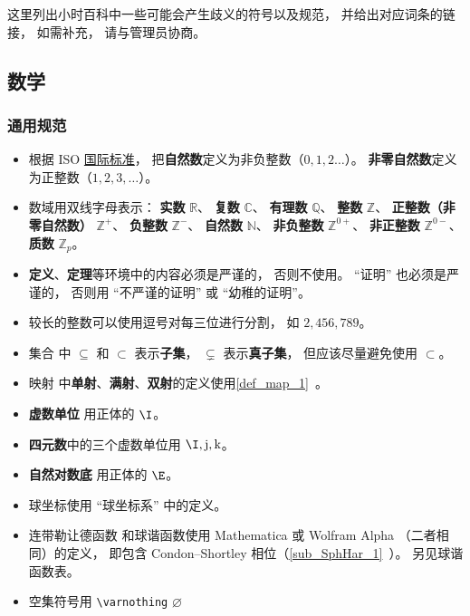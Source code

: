 
这里列出小时百科中一些可能会产生歧义的符号以及规范， 并给出对应词条的链接， 如需补充， 请与管理员协商。

\subsection{数学}
\subsubsection{通用规范}
\begin{itemize}
\item 根据 ISO \href{https://en.wikipedia.org/wiki/ISO/IEC_80000}{国际标准}， 把\textbf{自然数}定义为非负整数（$0,1,2\dots$）。 \textbf{非零自然数}定义为正整数（$1,2,3,\dots$）。
\item 数域用双线字母表示： \textbf{实数} $\mathbb R$、 \textbf{复数} $\mathbb C$、 \textbf{有理数} $\mathbb Q$、 \textbf{整数} $\mathbb Z$、 \textbf{正整数（非零自然数）} $\mathbb Z^+$、 \textbf{负整数} $\mathbb Z^-$、 \textbf{自然数} $\mathbb N$、 \textbf{非负整数} $\mathbb Z^{0+}$、 \textbf{非正整数} $\mathbb Z^{0-}$、 \textbf{质数} $\mathbb Z_p$。
\item \textbf{定义}、\textbf{定理}等环境中的内容必须是严谨的， 否则不使用。 “证明” 也必须是严谨的， 否则用 “不严谨的证明” 或 “幼稚的证明”。
\item 较长的整数可以使用逗号对每三位进行分割， 如 $2,456,789$。
\item 集合 中 $\subseteq$ 和 $\subset$ 表示\textbf{子集}， $\subsetneq$ 表示\textbf{真子集}， 但应该尽量避免使用 $\subset$。
\item 映射 中\textbf{单射}、\textbf{满射}、\textbf{双射}的定义使用\autoref{def_map_1}~。
\item \textbf{虚数单位} 用正体的 $\I$。
\item \textbf{四元数}中的三个虚数单位用 $\I, \mathrm{j}, \mathrm{k}$。
\item \textbf{自然对数底} 用正体的 $\E$。
\item 球坐标使用 “球坐标系” 中的定义。
\item 连带勒让德函数 和球谐函数使用 Mathematica 或 Wolfram Alpha （二者相同）的定义， 即包含 Condon–Shortley 相位（\autoref{sub_SphHar_1}~）。 另见球谐函数表。
\item 空集符号用 \verb|\varnothing| $\varnothing$
\end{itemize}

